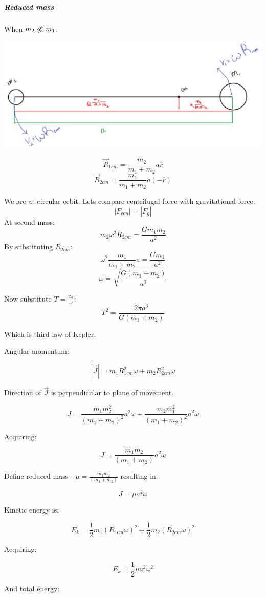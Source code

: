 \subparagraph{Reduced mass}
When $m_2 \centernot\ll m_1$:
\begin{center}
	\includegraphics[width=\linewidth]{./lect16/pic1.png}
\end{center}
$$\vec{R}_{1cm} = \frac{m_2}{m_1+m_2}a\hat{r}$$
$$\vec{R}_{2cm} = \frac{m_1}{m_1+m_2}a\left(-\hat{r}\right)$$

We are at circular orbit. Lets compare centrifugal force with gravitational force:
$$\left| F_{cen} \right| = \left| F_{g} \right|$$ 
At second mass:
$$m_2\omega^2 R_{2cm} = \frac{Gm_1m_2}{a^2}$$
By substituting $R_{2cm}$:
$$\omega^2 \frac{m_1}{m_1+m_2}a = \frac{Gm_1}{a^2}$$
$$\omega = \sqrt{\frac{G\left(m_1+m_2\right)}{a^3}}$$

Now substitute $T = \frac{2\pi}{\omega}$:
$$T^2 = \frac{2\pi a^3}{G\left( m_1+m_2 \right)}$$

Which is third law of Kepler.

Angular momentum:

$$\left|\vec{J}\right| = m_1R_{1cm}^2\omega+ m_2R_{2cm}^2\omega$$

Direction of $\vec{J}$ is perpendicular to plane of movement.

$$J = \frac{m_1m_2^2}{\left(m_1+m_2\right)^2}a^2\omega+ \frac{m_2m_1^2}{\left(m_1+m_2\right)^2}a^2\omega$$

Acquiring:

$$J = \frac{m_1m_2}{\left( m_1+m_2 \right)}a^2\omega$$

Define reduced mass - $\mu = \frac{m_1m_2}{\left( m_1+m_2 \right)}$ resulting in:

$$J  = \mu a^2 \omega$$

Kinetic energy is:

$$E_k = \frac{1}{2} m_1\left( R_{1cm}\omega \right)^2+\frac{1}{2} m_2\left( R_{2cm}\omega \right)^2$$

Acquiring:

$$E_k = \frac{1}{2}\mu a^2\omega^2$$

And total energy:

